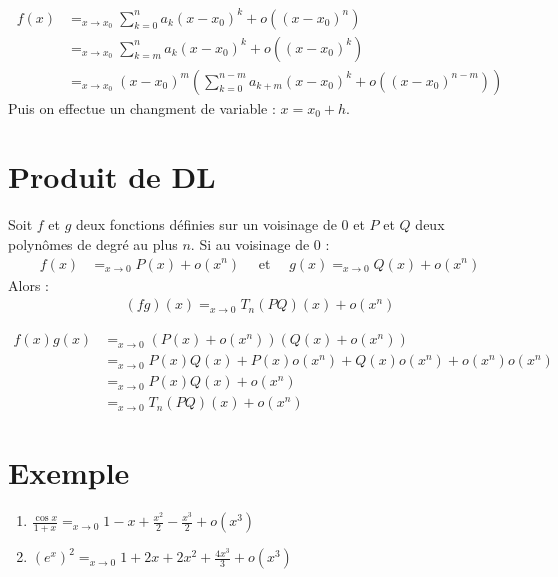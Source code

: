 \documentclass[../main.tex]{subfiles}
\begin{document}
\begin{align*}
    f(x) &=_{x\to x_0} \sum_{k=0}^{n} a_k (x - x_0)^k + o((x - x_0)^n) \\
    &=_{x\to x_0} \sum_{k=m}^{n} a_k (x - x_0)^k + o((x - x_0)^k) \\
    &=_{x\to x_0} (x - x_0)^m \left( \sum_{k=0}^{n-m} a_{k+m} (x - x_0)^k + o((x - x_0)^{n-m}) \right)
\end{align*}
Puis on effectue un changment de variable : $x = x_0 + h$.

\section{Produit de DL}
\begin{tcolorbox}[title=Propostion 25.56, title filled=false, colframe=lightblue, colback=lightblue!10!white]
    Soit $f$ et $g$ deux fonctions définies sur un voisinage de $0$ et $P$ et $Q$ deux polynômes de degré au plus $n$. Si au voisinage de $0$ : 
    \begin{align*}
        f(x) &=_{x\to 0} P(x) + o(x^n) \quad \text{ et } \quad g(x) =_{x\to 0} Q(x) + o(x^n)
    \end{align*}
    Alors : 
    \begin{align*}
        (fg)(x) =_{x\to 0} T_n(PQ)(x) + o(x^n)
    \end{align*}
\end{tcolorbox}

\begin{align*}
    f(x)g(x) &=_{x\to 0} (P(x) + o(x^n))(Q(x) + o(x^n)) \\
    &=_{x\to 0} P(x)Q(x) + P(x)o(x^n) + Q(x)o(x^n) + o(x^n)o(x^n) \\
    &=_{x\to 0} P(x)Q(x) + o(x^n) \\
    &=_{x\to 0} T_n(PQ)(x) + o(x^n)
\end{align*}

\section{Exemple}
\begin{tcolorbox}[title=Exemple 25.57, title filled=false, colframe=darkgreen, colback=darkgreen!10!white]
    \begin{enumerate}
        \item $\frac{\cos x}{1 + x} =_{x\to 0} 1 - x + \frac{x^2}{2} - \frac{x^3}{2} + o(x^3)$
        \item $(e^x)^2 =_{x\to 0} 1 + 2x + 2x^2 + \frac{4x^3}{3} + o(x^3)$
    \end{enumerate}
\end{tcolorbox}
\end{document}
